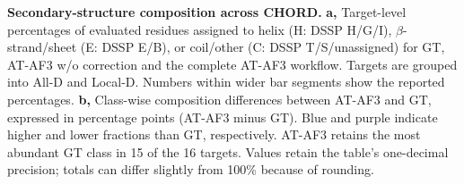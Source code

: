 \caption{\textbf{Secondary-structure composition across CHORD.}
\textbf{a,} Target-level percentages of evaluated residues assigned to helix
(H: DSSP H/G/I), $\beta$-strand/sheet (E: DSSP E/B), or coil/other
(C: DSSP T/S/unassigned) for GT, AT-AF3 w/o correction and the complete
AT-AF3 workflow. Targets are grouped into All-D and Local-D. Numbers within
wider bar segments show the reported percentages.
\textbf{b,} Class-wise composition differences between AT-AF3 and GT,
expressed in percentage points (AT-AF3 minus GT). Blue and purple indicate
higher and lower fractions than GT, respectively.
AT-AF3 retains the most abundant GT class in 15 of the 16 targets.
Values retain the table's one-decimal precision; totals can differ slightly
from 100\% because of rounding.}
\label{fig:secondary_composition}
